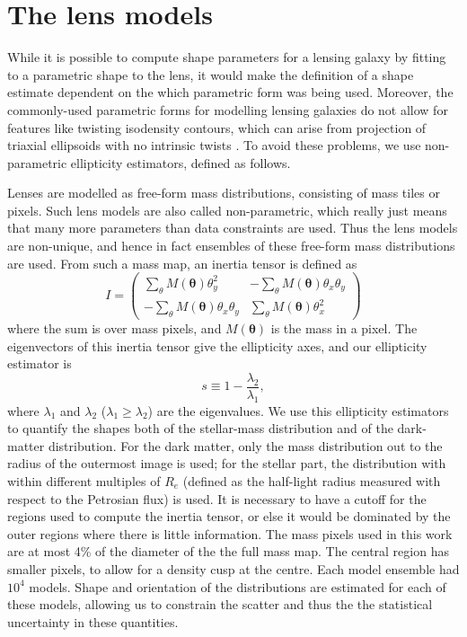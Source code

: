 \documentclass[useAMS,usenatbib]{mn2e}
\begin{document}
\section{The lens models}\label{sec:shapemethod}

While it is possible to compute shape parameters for a lensing galaxy by fitting to a parametric shape to the lens, it would make the definition of a shape estimate dependent on the which parametric form was being used. Moreover, the commonly-used parametric forms for modelling lensing galaxies \citep[e.g.][]{2001astro.ph..2341K} do not allow for features like twisting isodensity contours, which can arise from projection of triaxial ellipsoids with no intrinsic twists \citep[e.g.][and references therein]{1978ComAp...8...27B}. To avoid these problems, we use non-parametric ellipticity estimators, defined as follows.

Lenses are modelled as free-form mass distributions, consisting of mass tiles or pixels. Such lens models are also called non-parametric, which really just means that many more parameters than data constraints are used. Thus the lens models are non-unique, and hence in fact ensembles of these free-form mass distributions are used. From such a mass map, an inertia tensor is defined as
\begin{equation}\label{eq:inertiatensor}
I = 
\begin{pmatrix}
 \sum_\theta M(\boldsymbol{\theta})\theta^{2}_{y} & -\sum_\theta M(\boldsymbol{\theta})\theta_{x}\theta_{y} \\
-\sum_\theta M(\boldsymbol{\theta})\theta_{x}\theta_{y} & \sum_\theta M(\boldsymbol{\theta})\theta^{2}_{x}
\end{pmatrix}
\end{equation}
where the sum is over mass pixels, and $M(\boldsymbol{\theta})$ is the mass in a pixel. The eigenvectors of this inertia tensor give the ellipticity axes, and our ellipticity estimator is
\begin{equation}\label{eq:shapeestimate}
    s \equiv 1 - \frac{\lambda_{2}}{\lambda_{1}},
\end{equation}
where $\lambda_{1}$ and $\lambda_{2}$ ($\lambda_{1} \geq \lambda_{2}$) are the eigenvalues. We use this ellipticity estimators to quantify the shapes both of the stellar-mass distribution and of the dark-matter distribution. For the dark matter, only the mass distribution out to the radius of the outermost image is used; for the stellar part, the distribution with within different multiples of $R_e$ (defined as the half-light radius measured with respect to the Petrosian flux) is used. It is necessary to have a cutoff for the regions used to compute the inertia tensor, or else it would be dominated by the outer regions where there is little information. The mass pixels used in this work are at most 4\% of the diameter of the the full mass map. The central region has smaller pixels, to allow for a density cusp at the centre. Each model ensemble had $10^4$ models. Shape and orientation of the distributions are estimated for each of these models, allowing us to constrain the scatter and thus the the statistical uncertainty in these quantities.
\end{document}
